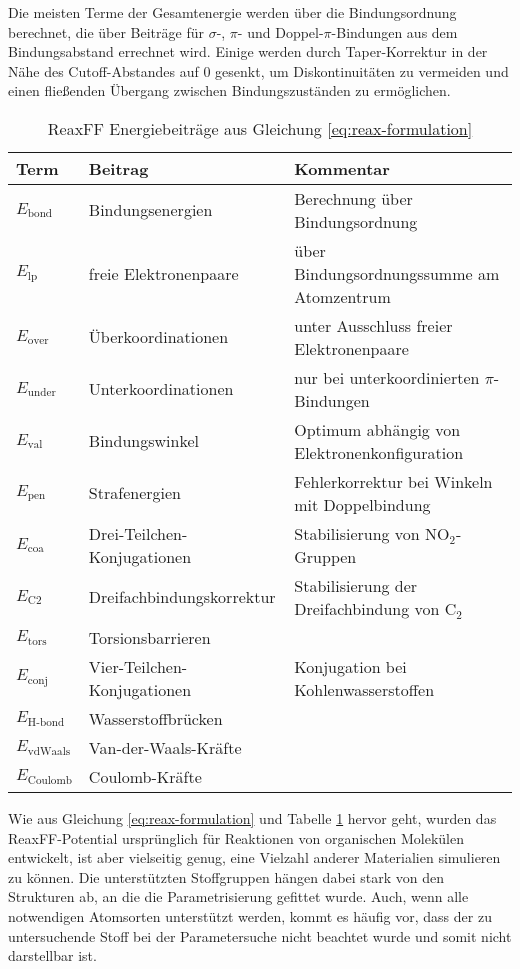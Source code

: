 Die meisten Terme der Gesamtenergie werden über die Bindungsordnung berechnet, die über Beiträge für $\sigma$-, $\pi$- und Doppel-$\pi$-Bindungen aus dem Bindungsabstand errechnet wird.
Einige werden durch Taper-Korrektur in der Nähe des Cutoff-Abstandes auf 0 gesenkt, um Diskontinuitäten zu vermeiden und einen fließenden Übergang zwischen Bindungszuständen zu ermöglichen.


\begin{table}
  \begin{tabularx}{\textwidth}{llX}
    \hline
    Term & Beitrag & Kommentar \\
    \hline
    $E_\text{bond}$ & Bindungsenergien & Berechnung über Bindungsordnung\\
    $E_\text{lp}$ & freie Elektronenpaare & über Bindungsordnungssumme am Atomzentrum\\
    $E_\text{over}$ & Überkoordinationen & unter Ausschluss freier Elektronenpaare\\
    $E_\text{under}$ & Unterkoordinationen & nur bei unterkoordinierten $\pi$-Bindungen\\
    $E_\text{val}$ & Bindungswinkel & Optimum abhängig von Elektronenkonfiguration\\
    $E_\text{pen}$ & Strafenergien & Fehlerkorrektur bei Winkeln mit Doppelbindung\\
    $E_\text{coa}$ & Drei-Teilchen-Konjugationen & Stabilisierung von NO$_2$-Gruppen\\
    $E_\text{C2}$ & Dreifachbindungskorrektur & Stabilisierung der Dreifachbindung von C$_2$\\
    $E_\text{tors}$ & Torsionsbarrieren & \\
    $E_\text{conj}$ & Vier-Teilchen-Konjugationen & Konjugation bei Kohlenwasserstoffen\\
    $E_\text{H-bond}$ & Wasserstoffbrücken & \\
    $E_\text{vdWaals}$ & Van-der-Waals-Kräfte & \\
    $E_\text{Coulomb}$ & Coulomb-Kräfte & \\
    \hline
  \end{tabularx}
  \caption[ReaxFF Energiebeiträge]{ReaxFF Energiebeiträge aus Gleichung \ref{eq:reax-formulation}}
  \label{tab:reax-energies}
\end{table}

Wie aus Gleichung \ref{eq:reax-formulation} und Tabelle \ref{tab:reax-energies} hervor geht, wurden das ReaxFF-Potential ursprünglich für Reaktionen von organischen Molekülen entwickelt, ist aber vielseitig genug, eine Vielzahl anderer Materialien simulieren zu können.
Die unterstützten Stoffgruppen hängen dabei stark von den Strukturen ab, an die die Parametrisierung gefittet wurde.
Auch, wenn alle notwendigen Atomsorten unterstützt werden, kommt es häufig vor, dass der zu untersuchende Stoff bei der Parametersuche nicht beachtet wurde und somit nicht darstellbar ist.

